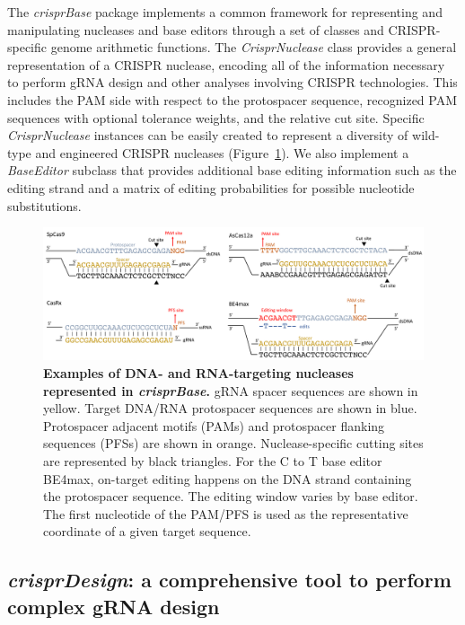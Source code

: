 \documentclass[pdftex,english,10pt]{article}
\begin{document}
The \textit{crisprBase} package implements a common framework for representing and manipulating nucleases and base editors through a set of classes and CRISPR-specific genome arithmetic functions. The \textit{CrisprNuclease} class provides a general representation of a CRISPR nuclease, encoding all of the information necessary to perform gRNA design and other analyses involving CRISPR technologies. This includes the PAM side with respect to the protospacer sequence, recognized PAM sequences with optional tolerance weights, and the relative cut site. Specific \textit{CrisprNuclease} instances can be easily created to represent a diversity of wild-type and engineered CRISPR nucleases (Figure~\ref{fig:nucleases}). We also implement a \textit{BaseEditor} subclass that provides additional base editing information such as the editing strand and a matrix of editing probabilities for possible nucleotide substitutions.

\begin{figure}[!h]
\centering
\includegraphics[width=1\textwidth]{figures/nucleases/nucleases.pdf}
  \caption{\textbf{Examples of DNA- and RNA-targeting nucleases represented in \textit{crisprBase}.} gRNA spacer sequences are shown in yellow. Target DNA/RNA protospacer sequences are shown in blue. Protospacer adjacent motifs (PAMs) and protospacer flanking sequences (PFSs) are shown in orange. Nuclease-specific cutting sites are represented by black triangles. For the C to T base editor BE4max, on-target editing happens on the DNA strand containing the protospacer sequence. The editing window varies by base editor. The first nucleotide of the PAM/PFS is used as the representative coordinate of a given target sequence. 
  }
  \label{fig:nucleases}
\end{figure}






\subsection{\textit{crisprDesign}: a comprehensive tool to perform complex gRNA design}
\end{document}
